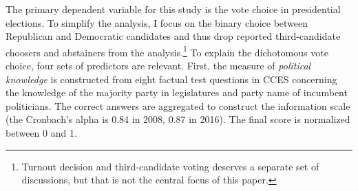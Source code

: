 \documentclass[letterpaper, 12pt]{article}
\begin{document}
    \par The primary dependent variable for this study is the vote choice in presidential elections. To simplify the analysis, I focus on the binary choice between Republican and Democratic candidates and thus drop reported third-candidate choosers and abstainers from the analysis.\footnote{Turnout decision and third-candidate voting deserves a separate set of discussions, but that is not the central focus of this paper.} To explain the dichotomous vote choice, four sets of predictors are relevant. First, the measure of \textit{political knowledge} is constructed from eight factual test questions in CCES concerning the knowledge of the majority party in legislatures and party name of incumbent politicians. The correct answers are aggregated to construct the information scale (the Cronbach's alpha is 0.84 in 2008, 0.87 in 2016). The final score is normalized between 0 and 1.  
    
\end{document}
